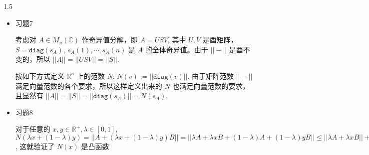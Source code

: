\documentclass{article}
\begin{document}
\begin{spacing}{1.5}
\begin{itemize}
    \item [2.] 习题7 
    
    考虑对 $A\in M_n(\mathbb{C})$ 作奇异值分解，即 $A = USV$, 其中 $U, V$ 是酉矩阵，$S = \mathtt{diag}(s_A)$, $s_A(1), \cdots, s_A(n)$ 是 $A$ 的全体奇异值。由于 $||-||$ 是酉不变的，所以 $||A|| = ||USV|| = ||S||$. 

    按如下方式定义 $\mathbb{R}^n$ 上的范数 $N$: $N(v) := ||\mathtt{diag}(v)||$. 由于矩阵范数 $||-||$ 满足向量范数的各个要求，所以这样定义出来的 $N$ 也满足向量范数的要求，且显然有 $||A|| = ||S|| = ||\mathtt{diag}(s_A)|| = N(s_A)$.
    
    \item [3.] 习题8 
    
    对于任意的 $x, y \in \mathbb{R}^{+}, \lambda \in [0, 1]$, $N\left(\lambda x + (1-\lambda)y\right) = ||A + \left( \lambda x + (1-\lambda) y \right) B|| = ||\lambda A + \lambda xB + (1-\lambda)A + (1-\lambda)y B|| \leq ||\lambda A + \lambda x B|| + ||(1-\lambda)A + (1-\lambda)yB|| = \lambda N(x) + (1-\lambda) N(y) $, 这就验证了 $N(x)$ 是凸函数
    

\end{itemize}
    
\end{spacing}
\end{document}
